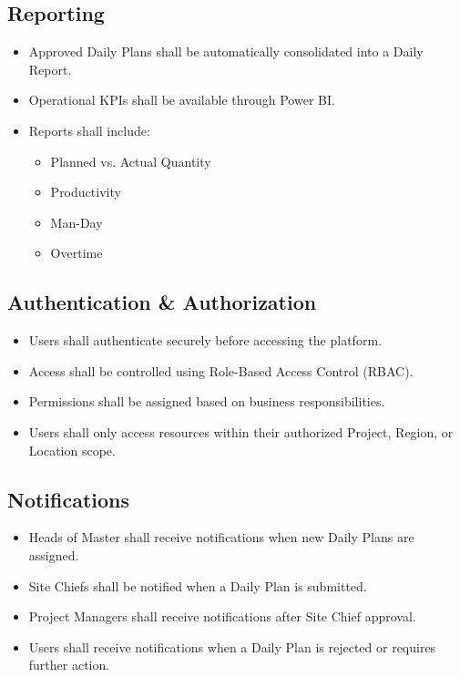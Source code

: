 \documentclass[11pt]{article}
\begin{document}
\subsection{Reporting}

\begin{itemize}
    \item Approved Daily Plans shall be automatically consolidated into a Daily
          Report.
    \item Operational KPIs shall be available through Power BI.
    \item Reports shall include:
          \begin{itemize}
              \item Planned vs. Actual Quantity
              \item Productivity
              \item Man-Day
              \item Overtime
          \end{itemize}
\end{itemize}

\subsection{Authentication \& Authorization}

\begin{itemize}
    \item Users shall authenticate securely before accessing the platform.
    \item Access shall be controlled using Role-Based Access Control (RBAC).
    \item Permissions shall be assigned based on business responsibilities.
    \item Users shall only access resources within their authorized Project,
          Region, or Location scope.
\end{itemize}

\subsection{Notifications}

\begin{itemize}
    \item Heads of Master shall receive notifications when new Daily Plans are
          assigned.
    \item Site Chiefs shall be notified when a Daily Plan is submitted.
    \item Project Managers shall receive notifications after Site Chief
          approval.
    \item Users shall receive notifications when a Daily Plan is rejected or
          requires further action.
\end{itemize}
\end{document}
